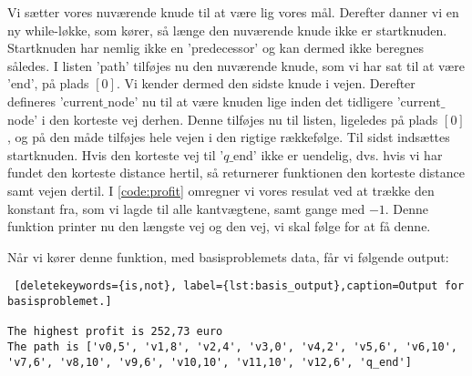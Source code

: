 Vi sætter vores nuværende knude til at være lig vores mål.
Derefter danner vi en ny while-løkke, som kører, så længe den nuværende knude ikke er startknuden. Startknuden har nemlig ikke en 'predecessor' og kan dermed ikke beregnes således. I listen 'path' tilføjes nu den nuværende knude, som vi har sat til at være 'end', på plads $[0]$. Vi kender dermed den sidste knude i vejen. Derefter defineres 'current$\_$node' nu til at være knuden lige inden det tidligere 'current$\_$node' i den korteste vej derhen. Denne tilføjes nu til listen, ligeledes på plads $[0]$, og på den måde tilføjes hele vejen i den rigtige rækkefølge. Til sidst indsættes startknuden.
Hvis den korteste vej til '$q\_$end' ikke er uendelig, dvs. hvis vi har fundet den korteste distance hertil, så returnerer funktionen den korteste distance samt vejen dertil.
I \autoref{code:profit} omregner vi vores resulat ved at trække den konstant fra, som vi lagde til alle kantvægtene, samt gange med $-1$. Denne funktion printer nu den længste vej og den vej, vi skal følge for at få denne. 

 

Når vi kører denne funktion, med basisproblemets data, får vi følgende output:

\begin{lstlisting} [deletekeywords={is,not}, label={lst:basis_output},caption=Output for basisproblemet.]

The highest profit is 252,73 euro
The path is ['v0,5', 'v1,8', 'v2,4', 'v3,0', 'v4,2', 'v5,6', 'v6,10', 'v7,6', 'v8,10', 'v9,6', 'v10,10', 'v11,10', 'v12,6', 'q_end']

\end{lstlisting}
